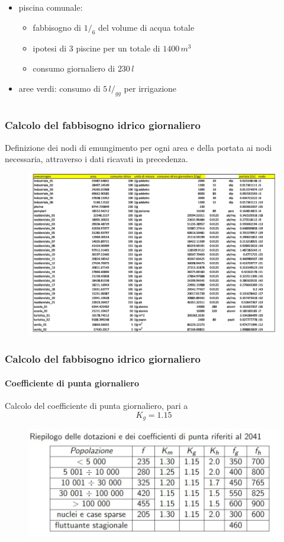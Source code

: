 \documentclass{beamer}
\begin{document}
{\begin{frame}[allowframebreaks]
\begin{columns}
\begin{column}{0.55\textwidth}
   \begin{itemize}
    \item piscina comunale:
    \begin{itemize}
     \item fabbisogno di $1/_6$ del volume di acqua totale
     \item ipotesi di $3$ piscine per un totale di $1400\,m^3$
     \item consumo giornaliero di $230\,l$
    \end{itemize}
    \item aree verdi: consumo di $5\,l/_{gg}$ per irrigazione
   \end{itemize}
  \end{column}
 \end{columns}
\end{frame}
}
%
%
%
\begin{frame}
 \frametitle{Calcolo del fabbisogno idrico giornaliero}
	Definizione dei nodi di emungimento per ogni area e della portata ai nodi necessaria, attraverso i dati ricavati in precedenza.	
   \begin{figure}
    \centering
    \includegraphics[width=.7\linewidth]{images/calcolo_consumo_idrico}
   \end{figure}
\end{frame}
%
\begin{frame}
 \frametitle{Calcolo del fabbisogno idrico giornaliero}
 \framesubtitle{Coefficiente di punta giornaliero}
 Calcolo del coefficiente di punta giornaliero, pari a
 \[
  K_g = 1.15
 \]

   \begin{figure}
    \centering
    \includegraphics[width=.7\linewidth]{images/coefficienti_punta}
   \end{figure}
\end{frame}
\end{document}
